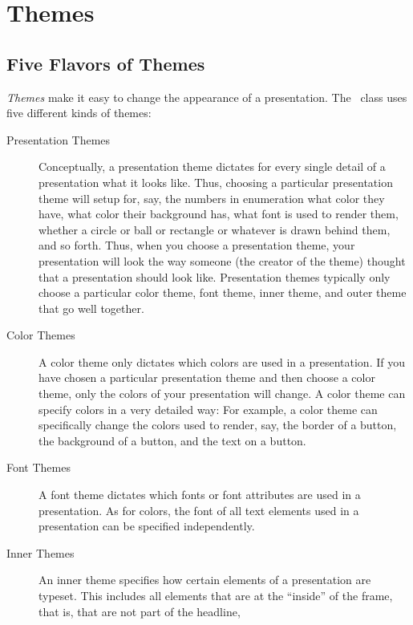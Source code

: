 
%


\section{Themes}


\subsection{Five Flavors of Themes}

\emph{Themes} make it easy to change the appearance of a
presentation. The \beamer\ class uses five different kinds of themes:
\begin{description}
\item[Presentation Themes]
  Conceptually, a presentation theme dictates for every single detail
  of a presentation what it looks like. Thus, choosing a particular
  presentation theme will setup for, say, the numbers in enumeration
  what color they have, what color their background has, what font is
  used to render them, whether a circle or ball or rectangle or
  whatever is drawn behind them, and so forth. Thus, when you choose
  a presentation theme, your presentation will look the way someone
  (the creator of the theme) thought that a presentation should look
  like. Presentation themes typically only choose a particular color
  theme, font theme, inner theme, and outer theme that go well
  together. 
\item[Color Themes]
  A color theme only dictates which colors are used in a
  presentation. If you have chosen a particular presentation theme
  and then choose a color theme, only the colors of your presentation
  will change. A color theme can specify colors in a very detailed
  way: For example, a color theme can specifically change the colors
  used to render, say, the border of a button, the background of a
  button, and the text on a button.
\item[Font Themes]
  A font theme dictates which fonts or font attributes are used in a
  presentation. As for colors, the font of all text elements used in a
  presentation can be specified independently.
\item[Inner Themes]
  An inner theme specifies how certain elements of a
  presentation are typeset. This includes all elements that are at the
  ``inside'' of the frame, that is, that are not part of the headline,

\end{description}
